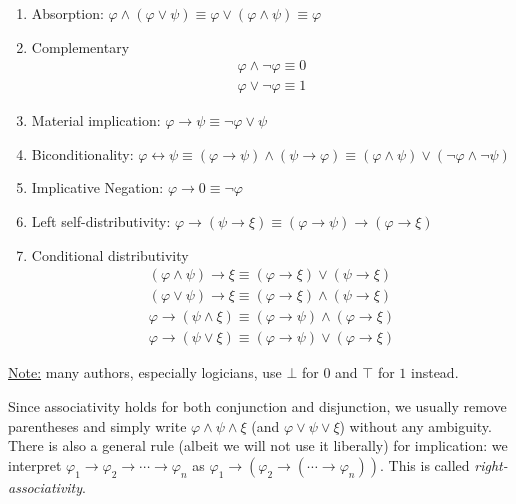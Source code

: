 \documentclass{treatise}
\begin{document}
\begin{proposition}
\begin{enumerate}
    \item Absorption: $\varphi \wedge (\varphi \vee \psi) \equiv \varphi \vee (\varphi \wedge \psi) \equiv \varphi$
    \item Complementary
    \begin{gather*}
        \varphi \wedge \neg \varphi \equiv 0
        \\
        \varphi \vee \neg \varphi \equiv 1
    \end{gather*}
    \item Material implication: $\varphi \to \psi \equiv \neg \varphi \vee \psi$
    \item Biconditionality: $\varphi \leftrightarrow \psi \equiv (\varphi \to \psi) \wedge (\psi \to \varphi) \equiv (\varphi \wedge \psi) \vee (\neg \varphi \wedge \neg \psi)$
    \item Implicative Negation: $\varphi \to 0 \equiv \neg \varphi$
    \item Left self-distributivity: $\varphi \to (\psi \to \xi) \equiv (\varphi \to \psi) \to (\varphi \to \xi)$
    \item Conditional distributivity
    \begin{gather*}
        (\varphi \wedge \psi) \to \xi \equiv (\varphi \to \xi) \vee (\psi \to \xi)
        \\
        (\varphi \vee \psi) \to \xi \equiv (\varphi \to \xi) \wedge (\psi \to \xi)
        \\
        \varphi \to (\psi \wedge \xi) \equiv (\varphi \to \psi) \wedge (\varphi \to \xi)
        \\
        \varphi \to (\psi \vee \xi) \equiv (\varphi \to \psi) \vee (\varphi \to \xi)
    \end{gather*}
\end{enumerate}
\underline{Note:} many authors, especially logicians, use $\bot$ for $0$ and $\top$ for $1$ instead.
\end{proposition}
\begin{remark}
Since associativity holds for both conjunction and disjunction, we usually remove parentheses and simply write $\varphi \wedge \psi \wedge \xi$ (and $\varphi \vee \psi \vee \xi$) without any ambiguity. There is also a general rule (albeit we will not use it liberally) for implication: we interpret $\varphi_1 \to \varphi_2 \to \cdots \to \varphi_n$ as $\varphi_1 \to (\varphi_2 \to (\cdots \to \varphi_n))$. This is called \emph{right-associativity}.
\end{remark}
\end{document}
